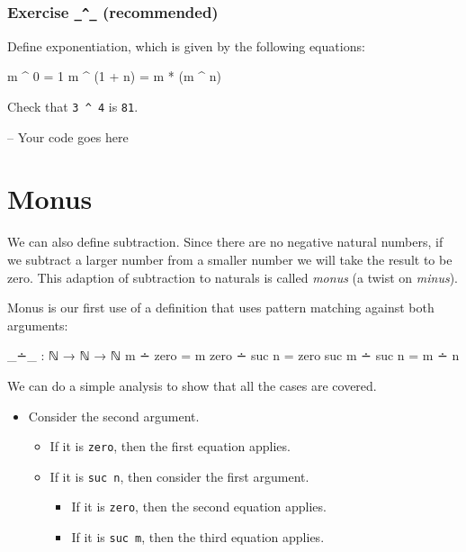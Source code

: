 \hypertarget{Naturals-power}{%
\subsubsection{\texorpdfstring{Exercise \texttt{\_\^{}\_}
(recommended)}{Exercise \_\^{}\_ (recommended)}}\label{Naturals-power}}

Define exponentiation, which is given by the following equations:

\begin{myDisplay}
m ^ 0        =  1
m ^ (1 + n)  =  m * (m ^ n)
\end{myDisplay}

Check that \texttt{3\ \^{}\ 4} is \texttt{81}.

\begin{fence}
\begin{code}
-- Your code goes here
\end{code}
\end{fence}

\hypertarget{monus}{%
\section{Monus}\label{monus}}

We can also define subtraction. Since there are no negative natural
numbers, if we subtract a larger number from a smaller number we will
take the result to be zero. This adaption of subtraction to naturals is
called \emph{monus} (a twist on \emph{minus}).

Monus is our first use of a definition that uses pattern matching
against both arguments:

\begin{fence}
\begin{code}
_∸_ : ℕ → ℕ → ℕ
m     ∸ zero   =  m
zero  ∸ suc n  =  zero
suc m ∸ suc n  =  m ∸ n
\end{code}
\end{fence}

We can do a simple analysis to show that all the cases are covered.

\begin{itemize}
\tightlist
\item
  Consider the second argument.

  \begin{itemize}
  \tightlist
  \item
    If it is \texttt{zero}, then the first equation applies.
  \item
    If it is \texttt{suc\ n}, then consider the first argument.

    \begin{itemize}
    \tightlist
    \item
      If it is \texttt{zero}, then the second equation applies.
    \item
      If it is \texttt{suc\ m}, then the third equation applies.
    \end{itemize}
  \end{itemize}
\end{itemize}

